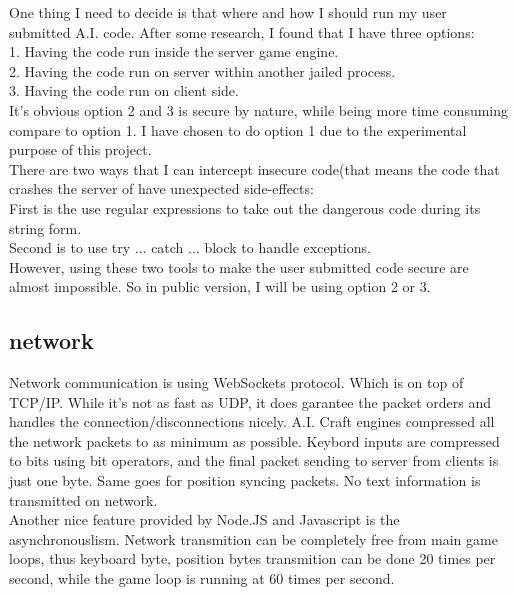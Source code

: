 \documentclass[12pt]{article}
\begin{document}
{\color{red}
One thing I need to decide is that where and how I should run my user submitted A.I. code. After some research, I found that I have three options:\\
1. Having the code run inside the server game engine.\\
2. Having the code run on server within another jailed process.\\
3. Having the code run on client side.\\ 

It's obvious option 2 and 3 is secure by nature, while being more time consuming compare to option 1. I have chosen to do option 1 due to the experimental purpose of this project.\\

There are two ways that I can intercept insecure code(that means the code that crashes the server of have unexpected side-effects:\\
First is the use regular expressions to take out the dangerous code during its string form.\\
Second is to use try ... catch ... block to handle exceptions.\\

However, using these two tools to make the user submitted code secure are almost impossible. So in public version, I will be using option 2 or 3.
}

\subsection{network}

Network communication is using WebSockets protocol. Which is on top of TCP/IP. While it's not as fast as UDP, it does garantee the packet orders and handles the connection/disconnections nicely. A.I. Craft engines compressed all the network packets to as minimum as possible. Keybord inputs are compressed to bits using bit operators, and the final packet sending to server from clients is just one byte. Same goes for position syncing packets. No text information is transmitted on network.\\

Another nice feature provided by Node.JS and Javascript is the asynchronouslism. Network transmition can be completely free from main game loops, thus keyboard byte, position bytes transmition can be done 20 times per second, while the game loop is running at 60 times per second.\\
\end{document}
